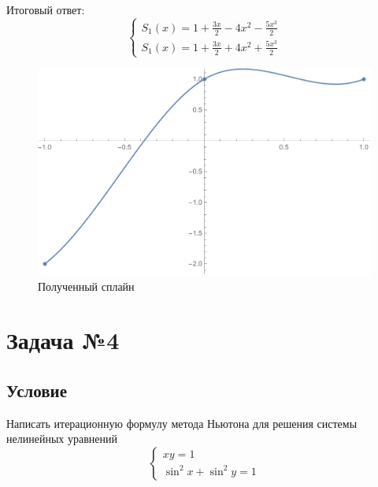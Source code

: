 \documentclass[a4paper, 12pt]{article}
\begin{document}
	Итоговый ответ:
	\begin{equation*}
	\begin{cases}
	S_1(x)=1+\frac{3x}{2}-4x^2-\frac{5x^3}{2}\\
	S_1(x)=1+\frac{3x}{2}+4x^2+\frac{5x^3}{2}
	\end{cases}
	\end{equation*}
	\begin{figure}[h]
		\centering
		\includegraphics[scale=0.5]{spline}
		\caption{Полученный сплайн}
	\end{figure}
	\section*{Задача №4}
	\subsection*{Условие}
	Написать итерационную формулу метода Ньютона для решения системы нелинейных уравнений
	\begin{equation*}
	\begin{cases}
	xy=1\\
	\sin^2x+\sin^2y=1
	\end{cases}
	\end{equation*}
\end{document}
